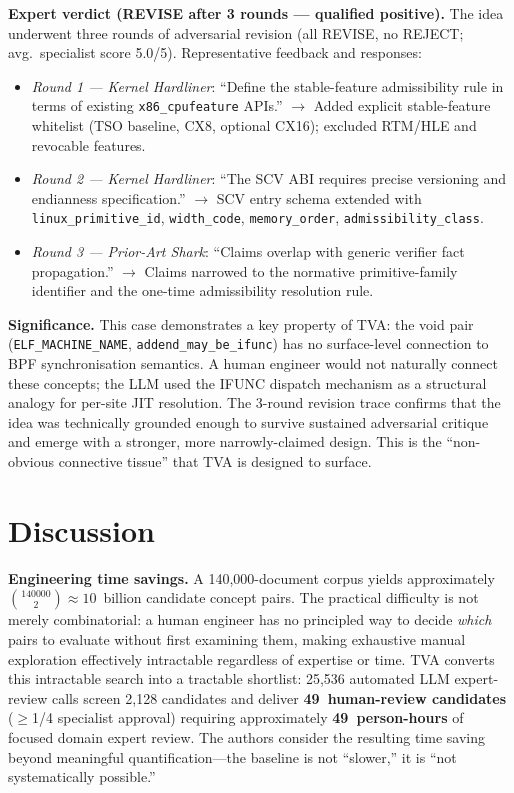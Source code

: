 \documentclass[11pt,twocolumn]{article}
\begin{document}
\textbf{Expert verdict (REVISE after 3 rounds --- qualified positive).}
The idea underwent three rounds of adversarial revision (all REVISE,
no REJECT; avg.\ specialist score 5.0/5).  Representative feedback
and responses:
\begin{itemize}[noitemsep,topsep=2pt]
  \item \textit{Round 1 --- Kernel Hardliner}: ``Define the stable-feature
    admissibility rule in terms of existing \texttt{x86\_cpufeature} APIs.''
    $\to$ Added explicit stable-feature whitelist (TSO baseline, CX8,
    optional CX16); excluded RTM/HLE and revocable features.
  \item \textit{Round 2 --- Kernel Hardliner}: ``The SCV ABI requires
    precise versioning and endianness specification.''
    $\to$ SCV entry schema extended with \texttt{linux\_primitive\_id},
    \texttt{width\_code}, \texttt{memory\_order}, \texttt{admissibility\_class}.
  \item \textit{Round 3 --- Prior-Art Shark}: ``Claims overlap with
    generic verifier fact propagation.''
    $\to$ Claims narrowed to the normative primitive-family identifier
    and the one-time admissibility resolution rule.
\end{itemize}

\textbf{Significance.}  This case demonstrates a key property of TVA:
the void pair (\texttt{ELF\_MACHINE\_NAME}, \texttt{addend\_may\_be\_ifunc})
has no surface-level connection to BPF synchronisation semantics.  A
human engineer would not naturally connect these concepts; the LLM
used the IFUNC dispatch mechanism as a structural analogy for per-site
JIT resolution.  The 3-round revision trace confirms that the idea was
technically grounded enough to survive sustained adversarial critique
and emerge with a stronger, more narrowly-claimed design.
This is the ``non-obvious connective tissue'' that TVA is designed to surface.

\section{Discussion}
\label{sec:disc}

\textbf{Engineering time savings.}
A 140,000-document corpus yields approximately $\binom{140000}{2}
\approx 10$~billion candidate concept pairs.
The practical difficulty is not merely combinatorial: a human engineer
has no principled way to decide \emph{which} pairs to evaluate without
first examining them, making exhaustive manual exploration effectively
intractable regardless of expertise or time.
TVA converts this intractable search into a tractable shortlist:
25,536 automated LLM expert-review calls screen 2,128 candidates and
deliver \textbf{49~human-review candidates} ($\geq$1/4 specialist
approval) requiring approximately \textbf{49~person-hours} of focused
domain expert review.
The authors consider the resulting time saving beyond meaningful
quantification---the baseline is not ``slower,'' it is ``not
systematically possible.''
\end{document}
